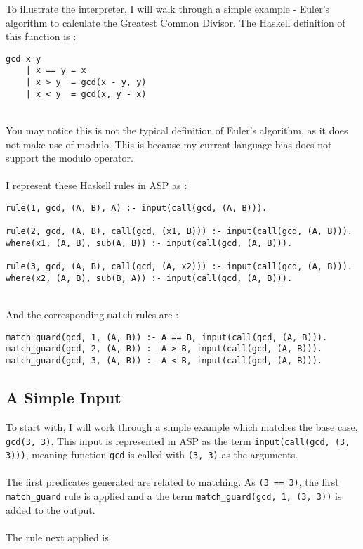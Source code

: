 To illustrate the interpreter, I will walk through a simple example - Euler's algorithm to calculate the Greatest Common Divisor. The Haskell definition of this function is : \\

\begin{lstlisting}
gcd x y
	| x == y = x
	| x > y  = gcd(x - y, y)
	| x < y  = gcd(x, y - x)
\end{lstlisting}
\mbox{} \\
You may notice this is not the typical definition of Euler's algorithm, as it does not make use of modulo. This is because my current language bias does not support the modulo operator. \\ \\
I represent these Haskell rules in ASP as :\\

\begin{lstlisting}
rule(1, gcd, (A, B), A) :- input(call(gcd, (A, B))).

rule(2, gcd, (A, B), call(gcd, (x1, B))) :- input(call(gcd, (A, B))).
where(x1, (A, B), sub(A, B)) :- input(call(gcd, (A, B))).

rule(3, gcd, (A, B), call(gcd, (A, x2))) :- input(call(gcd, (A, B))).
where(x2, (A, B), sub(B, A)) :- input(call(gcd, (A, B))).
\end{lstlisting}
\mbox{} \\
And the corresponding \lstinline{match} rules are :\\ %

\begin{lstlisting}
match_guard(gcd, 1, (A, B)) :- A == B, input(call(gcd, (A, B))).
match_guard(gcd, 2, (A, B)) :- A > B, input(call(gcd, (A, B))).
match_guard(gcd, 3, (A, B)) :- A < B, input(call(gcd, (A, B))).
\end{lstlisting}

\subsection{A Simple Input}
To start with, I will work through a simple example which matches the base case, \lstinline{gcd(3, 3)}. This input is represented in ASP as the term \lstinline{input(call(gcd, (3, 3)))}, meaning function \lstinline{gcd} is called with \lstinline{(3, 3)} as the arguments. \\ \\
The first predicates generated are related to matching. As \lstinline{(3 == 3)}, the first \lstinline{match_guard} rule is applied and a the term \lstinline{match_guard(gcd, 1, (3, 3))} is added to the output.\\ \\ %
The rule next applied is \\

